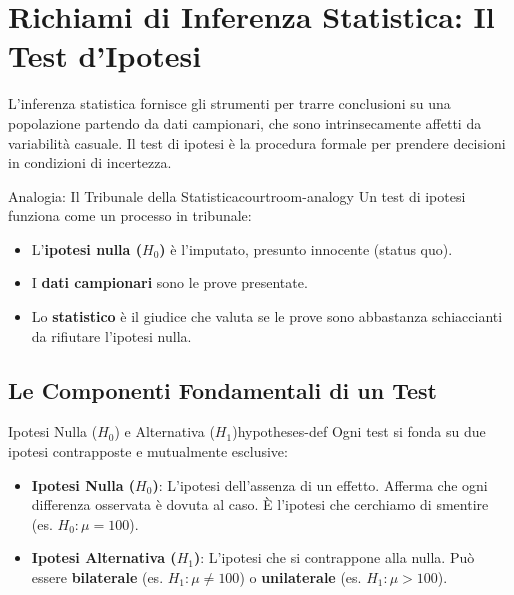 \section{Richiami di Inferenza Statistica: Il Test d'Ipotesi}

L'inferenza statistica fornisce gli strumenti per trarre conclusioni su una
popolazione partendo da dati campionari, che sono intrinsecamente affetti da
variabilità casuale. Il test di ipotesi è la procedura formale per prendere
decisioni in condizioni di incertezza.

\begin{nota}{Analogia: Il Tribunale della Statistica}{courtroom-analogy}
	Un test di ipotesi funziona come un processo in tribunale:
	\begin{itemize}
		\item L'\textbf{ipotesi nulla ($H_0$)} è l'imputato, presunto innocente
		      (status quo).
		\item I \textbf{dati campionari} sono le prove presentate.
		\item Lo \textbf{statistico} è il giudice che valuta se le prove sono
		      abbastanza schiaccianti da rifiutare l'ipotesi nulla.
	\end{itemize}
\end{nota}

\subsection{Le Componenti Fondamentali di un Test}

\begin{definizione}{Ipotesi Nulla ($H_0$) e Alternativa ($H_1$)}{hypotheses-def}
	Ogni test si fonda su due ipotesi contrapposte e mutualmente esclusive:
	\begin{itemize}
		\item \textbf{Ipotesi Nulla ($H_0$)}: L'ipotesi dell'assenza di un
		      effetto. Afferma che ogni differenza osservata è dovuta al caso. È
		      l'ipotesi che cerchiamo di smentire (es. $H_0: \mu = 100$).
		\item \textbf{Ipotesi Alternativa ($H_1$)}: L'ipotesi che si contrappone
		      alla nulla. Può essere \textbf{bilaterale} (es. $H_1: \mu \neq 100$) o
		      \textbf{unilaterale} (es. $H_1: \mu > 100$).
	\end{itemize}
\end{definizione}

